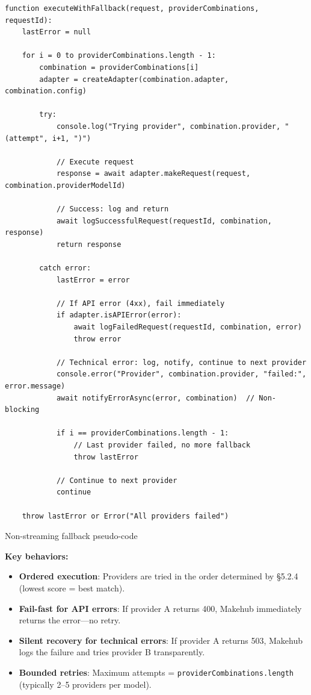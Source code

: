 \documentclass[english]{article}
\begin{document}
\begin{listing}[H]
\begin{verbatim}
function executeWithFallback(request, providerCombinations, requestId):
    lastError = null

    for i = 0 to providerCombinations.length - 1:
        combination = providerCombinations[i]
        adapter = createAdapter(combination.adapter, combination.config)

        try:
            console.log("Trying provider", combination.provider, "(attempt", i+1, ")")

            // Execute request
            response = await adapter.makeRequest(request, combination.providerModelId)

            // Success: log and return
            await logSuccessfulRequest(requestId, combination, response)
            return response

        catch error:
            lastError = error

            // If API error (4xx), fail immediately
            if adapter.isAPIError(error):
                await logFailedRequest(requestId, combination, error)
                throw error

            // Technical error: log, notify, continue to next provider
            console.error("Provider", combination.provider, "failed:", error.message)
            await notifyErrorAsync(error, combination)  // Non-blocking

            if i == providerCombinations.length - 1:
                // Last provider failed, no more fallback
                throw lastError

            // Continue to next provider
            continue

    throw lastError or Error("All providers failed")
\end{verbatim}
\caption{Non-streaming fallback pseudo-code}
\end{listing}

\textbf{Key behaviors:}
\begin{itemize}
    \item \textbf{Ordered execution}: Providers are tried in the order determined by §5.2.4 (lowest score = best match).
    \item \textbf{Fail-fast for API errors}: If provider A returns 400, Makehub immediately returns the error—no retry.
    \item \textbf{Silent recovery for technical errors}: If provider A returns 503, Makehub logs the failure and tries provider B transparently.
    \item \textbf{Bounded retries}: Maximum attempts = \texttt{providerCombinations.length} (typically 2--5 providers per model).
\end{itemize}
\end{document}
